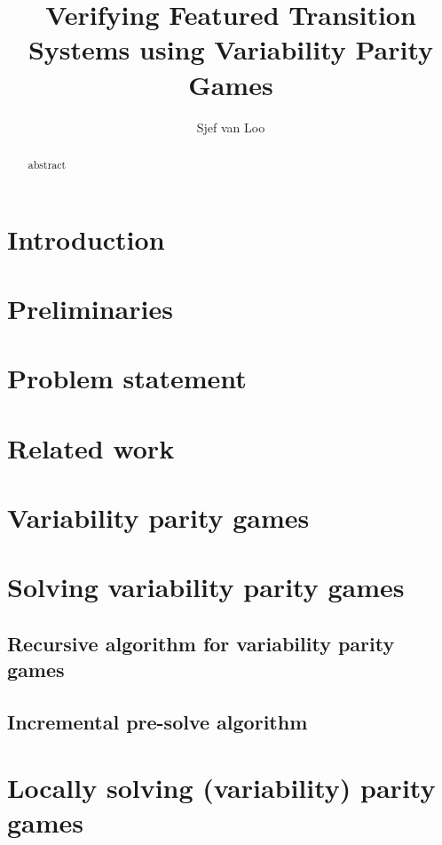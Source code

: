 \documentclass[]{article}
\title{Verifying Featured Transition Systems using Variability Parity Games}
\author{Sjef van Loo}
\theoremstyle{definition}
\begin{document}
\maketitle
\begin{abstract}
	abstract
\end{abstract}

\newpage
\tableofcontents

\pagebreak
\section{Introduction}


\section{Preliminaries}


\section{Problem statement}


\section{Related work}


\pagebreak
\section{Variability parity games}
\label{part:verifying}


\pagebreak
\section{Solving variability parity games}


\subsection{Recursive algorithm for variability parity games}


\subsection{Incremental pre-solve algorithm}


\pagebreak
\section{Locally solving (variability) parity games}

\end{document}
